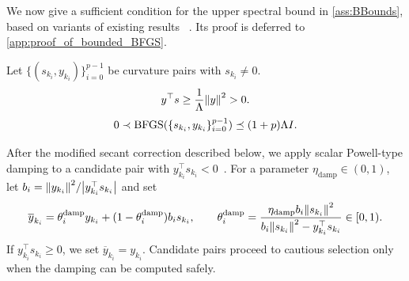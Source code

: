 \documentclass[journal_revised_MPC]{subfiles}
\begin{document}
We now give a sufficient condition for the upper spectral bound in \cref{ass:BBounds}, based on variants of existing results~\citep[Theorem~5.5]{gaoQuasiNewtonMethodsSuperlinear2018} \citep[Lemma~1]{gowerStochasticBlockBFGS2016}.
Its proof is deferred to \cref{app:proof_of_bounded_BFGS}.
\begin{proposition}\label{prop:bounded_BFGS}
    Let $\{(s_{k_i},y_{k_i})\}_{i=0}^{p-1}$ be curvature pairs with $s_{k_i} \neq 0$.
    \begin{equation}
        y^\top s \ge \frac{1}{\Lambda}\norm{y}^2>0. \label{eq:curvature_conditions1}
    \end{equation}
    \begin{equation}\label{eq:bounded_BFGS_mM}
        0\prec \mathrm{BFGS}(\{s_{k_i},y_{k_i}\}_{i=0}^{p-1}) \preceq (1+p)\Lambda I.
    \end{equation}
\end{proposition}
After the modified secant correction described below, we apply scalar Powell-type damping to a candidate pair with $y_{k_i}^{\top}s_{k_i}<0$~\citep{powellAlgorithmsNonlinearConstraints1978,lotfiStochasticDampedLBFGS2020}.
For a parameter $\eta_{\mathrm{damp}}\in(0,1)$, let $b_i=\norm{y_{k_i}}^2/\abs{y_{k_i}^{\top}s_{k_i}}$ and set
\begin{equation*}
    \overline y_{k_i}
    = \theta_i^{\mathrm{damp}} y_{k_i}
    + (1 - \theta_i^{\mathrm{damp}}) b_i s_{k_i},
    \qquad
    \theta_i^{\mathrm{damp}}
    = \frac{\eta_{\mathrm{damp}} b_i \norm{s_{k_i}}^2}{b_i \norm{s_{k_i}}^2 - y_{k_i}^{\top} s_{k_i}} \in [0, 1).
\end{equation*}
If $y_{k_i}^{\top}s_{k_i}\geq0$, we set $\overline y_{k_i}=y_{k_i}$.
Candidate pairs proceed to cautious selection only when the damping can be computed safely.
\end{document}
